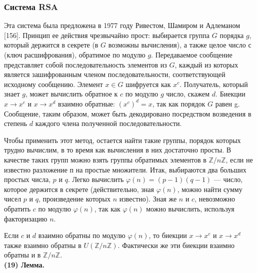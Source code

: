 \documentclass{mai_book}
\begin{document}
\subsubsection{Система RSA}
\par
 Эта система была предложена в 1977 году Ривестом, Шамиром и
Адлеманом [156]. Принцип ее действия чрезвычайно прост: выбирается
группа $G$ порядка $g$, который держится в секрете (в $G$ возможны 
вычисления), а также целое число $с$ (ключ расшифрования), обратимое по
модулю $g$. Передаваемое сообщение представляет собой 
последовательность элементов из $G$, каждый из которых является зашифрованным
членом последовательности, соответствующей исходному сообщению.
Элемент $x \in G$ шифруется как $x^c$. Получатель, который знает $g$, может
вычислить обратное к $c$ по модулю $g$ число, скажем $d$. Биекции $x \rightarrow x^c$ и $x \rightarrow x^d$ взаимно обратные: $(x^{c})^{d} = x$, так как порядок $G$ равен g. Сообщение, таким образом, может быть декодировано посредством возведения в степень $d$ каждого члена полученной последовательности.\par
  Чтобы применить этот метод, остается найти такие группы, 
порядок которых трудно вычислим, в то время как вычисления в них 
достаточно просты. В качестве таких групп можно взять группы обратимых
элементов в $\mathbb{Z}/n\mathbb{Z}$, если не известно разложение п на простые множители. Итак, выбираются два больших простых числа, $p$ и $q$. Легко 
вычислить $\varphi(n) = (p - 1)(q - 1)$ --- число, которое держится в секрете (действительно, зная $\varphi (n)$, можно найти сумму чисел $p$ и $q$, произведение которых $n$ известно). Зная же $n$ и $c$, невозможно обратить $c$ по модулю $\varphi (n)$, так как $\varphi (n)$ можно вычислить, используя факторизацию $n$.\par
 Если $c$ и $d$ взаимно обратны по модулю $\varphi(n)$, то биекции $x \rightarrow x^c$ и $x \rightarrow x^d$ также взаимно обратны в $U(\mathbb{Z}/n\mathbb{Z})$. Фактически же эти биекции взаимно обратны и в $\mathbb{Z}/n\mathbb{Z}$. \\
 
\textbf{(19) Лемма.} \\
\end{document}
